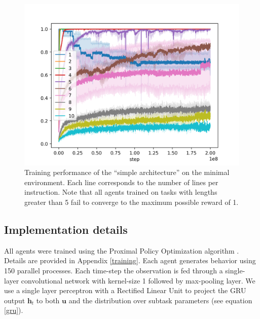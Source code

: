 \documentclass{article}
\begin{document}
\begin{figure}[t]
\vskip 0.2in
\centerline{\includegraphics[width=\columnwidth]{simple-rewards.png}}
\caption{Training performance of the ``simple architecture'' on the minimal
environment. Each line corresponds to the number of lines per instruction.
Note that all agents trained on tasks with lengths greater than 5 fail to
converge to the maximum possible reward of 1.}
\label{simple-rewards}
\vskip -0.2in
\end{figure}

\subsection{Implementation details}
All agents were trained using the Proximal Policy Optimization algorithm
\cite{schulman2017proximal}. Details are provided in Appendix \ref{training}.
Each agent generates behavior using 150 parallel processes. Each time-step the
observation is fed through a single-layer convolutional network with kernel-size
1 followed by max-pooling layer. We use a single layer perceptron with a
Rectified Linear Unit \cite{nair2010rectified} to project the GRU output
$\mathbf{h}_t$ to both $\mathbf{u}$ and the distribution over
subtask parameters (see equation \ref{gru}).
\end{document}

